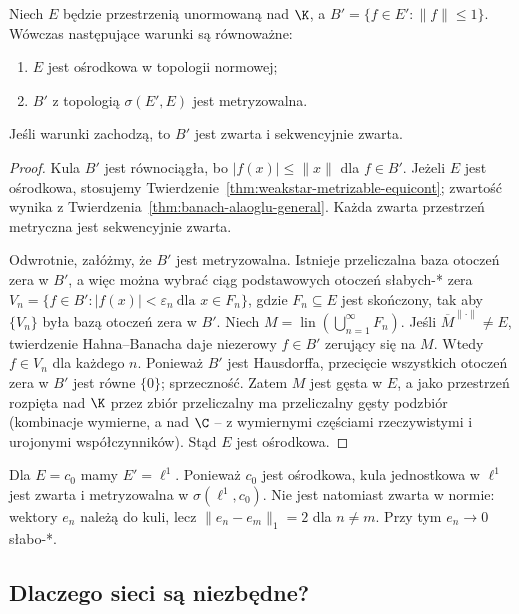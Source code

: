 \begin{twierdzenie}
\label{thm:banach-ball-metrizable-iff-separable}
Niech $E$ będzie przestrzenią unormowaną nad $\K$,
a $B'=\{f\in E':\|f\|\le1\}$. Wówczas następujące
warunki są równoważne:
\begin{enumerate}
\item $E$ jest ośrodkowa w topologii normowej;
\item $B'$ z topologią $\sigma(E',E)$ jest metryzowalna.
\end{enumerate}
Jeśli warunki zachodzą, to $B'$ jest zwarta i sekwencyjnie zwarta.
\end{twierdzenie}
\begin{proof}
Kula $B'$ jest równociągła, bo $|f(x)|\le\|x\|$ dla $f\in B'$.
Jeżeli $E$ jest ośrodkowa, stosujemy
Twierdzenie~\ref{thm:weakstar-metrizable-equicont};
zwartość wynika z Twierdzenia~\ref{thm:banach-alaoglu-general}.
Każda zwarta przestrzeń metryczna jest sekwencyjnie zwarta.

Odwrotnie, załóżmy, że $B'$ jest metryzowalna. Istnieje
przeliczalna baza otoczeń zera w $B'$, a więc można wybrać
ciąg podstawowych otoczeń słabych-* zera
$V_n=\{f\in B':|f(x)|<\varepsilon_n\ \text{dla }x\in F_n\}$,
gdzie $F_n\subseteq E$ jest skończony, tak aby $\{V_n\}$
była bazą otoczeń zera w $B'$. Niech
$M=\operatorname{lin}(\bigcup_{n=1}^\infty F_n)$.
Jeśli $\overline M^{\|\cdot\|}\ne E$, twierdzenie Hahna--Banacha
daje niezerowy $f\in B'$ zerujący się na $M$.
Wtedy $f\in V_n$ dla każdego $n$. Ponieważ $B'$ jest Hausdorffa,
przecięcie wszystkich otoczeń zera w $B'$ jest równe $\{0\}$;
sprzeczność. Zatem $M$ jest gęsta w $E$, a jako przestrzeń
rozpięta nad $\K$ przez zbiór przeliczalny ma przeliczalny
gęsty podzbiór (kombinacje wymierne, a nad $\C$ -- z
wymiernymi częściami rzeczywistymi i urojonymi współczynników).
Stąd $E$ jest ośrodkowa.
\end{proof}

\begin{przyklad}
Dla $E=c_0$ mamy $E'=\ell^1$. Ponieważ $c_0$ jest ośrodkowa,
kula jednostkowa w $\ell^1$ jest zwarta i metryzowalna
w $\sigma(\ell^1,c_0)$. Nie jest natomiast zwarta w normie:
wektory $e_n$ należą do kuli, lecz $\|e_n-e_m\|_1=2$
dla $n\ne m$. Przy tym $e_n\to0$ słabo-*.
\end{przyklad}

\subsection{Dlaczego sieci są niezbędne?}

